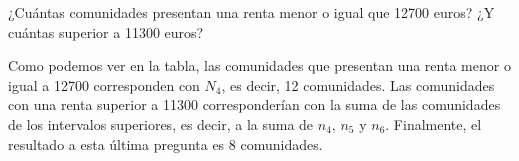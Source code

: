 \begin{center}
\end{center} 

\subproblem
¿Cuántas comunidades presentan una renta menor o igual que 12700 euros? ¿Y cuántas superior a 11300 euros?

Como podemos ver en la tabla, las comunidades que presentan una renta menor o igual a 12700 corresponden con $N_{4}$, es decir, 12 comunidades.
Las comunidades con una renta superior a 11300 corresponderían con la suma de las comunidades de los intervalos superiores, es decir, a la suma de $n_{4}$, $n_{5}$ y $n_{6}$. Finalmente, el resultado a esta última pregunta es 8 comunidades.
